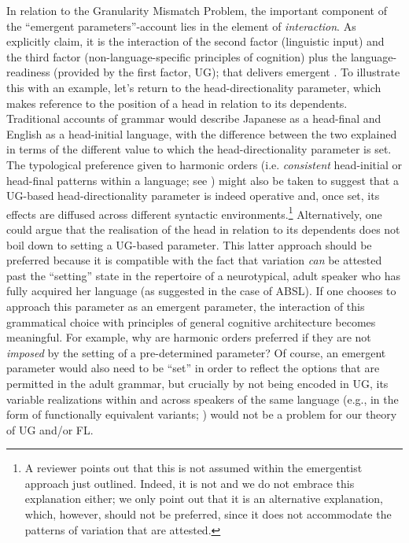 \documentclass[output=paper]{langsci/langscibook}
\begin{document}
\largerpage
In relation to the Granularity Mismatch Problem, the important component of the
\enquote{emergent parameters}-account lies in the element of
\emph{interaction}. As \citet{BibRobShee2014} explicitly claim, it is the
interaction of the second factor (linguistic input) and the third factor
(non-language-specific principles of cognition) plus the language-readiness
(provided by the first factor, \gls{UG}); that delivers emergent . To
illustrate this with an example, let’s return to the head-directionality
parameter, which makes reference to the position of a head in relation to its
dependents. Traditional accounts of grammar would describe Japanese as a
head-final and English as a head-initial language, with the difference between
the two explained in terms of the different value to which the
head-directionality parameter is set. The typological preference given to
harmonic orders (i.e. \emph{consistent} head-initial or head-final patterns
within a language; see \citealt{Hawkins2010}) might also be taken to suggest
that a UG-based head-directionality parameter is indeed operative and, once
set, its effects are diffused across different syntactic
environments.\footnote{A reviewer points out that this is not assumed within
    the emergentist approach just outlined. Indeed, it is not and we do not
    embrace this explanation either; we only point out that it is an
    alternative explanation, which, however, should not be preferred, since it
    does not accommodate the patterns of variation that are attested.}
    Alternatively, one could argue that the realisation of the head in relation
    to its dependents does not boil down to setting a \gls{UG}-based parameter.
    This latter approach should be preferred because it is compatible with the
    fact that variation \emph{can} be attested past the \enquote{setting} state in the
    repertoire of a neurotypical, adult speaker who has fully acquired her
    language (as suggested in the case of ABSL).  If one chooses to approach
    this parameter as an emergent parameter, the interaction of this
    grammatical choice with principles of general cognitive architecture
    becomes meaningful. For example, why are harmonic orders preferred if they
    are not \emph{imposed} by the setting of a pre-determined parameter? Of
    course, an emergent parameter would also need to be \enquote{set} in order
    to reflect the options that are permitted in the adult grammar, but
    crucially by not being encoded in \gls{UG}, its variable realizations
    within and across speakers of the same language (e.g., in the form of
    functionally equivalent variants; \citealt{LeivadaEtAl2017b}) would not be
    a problem for our theory of \gls{UG} and/or \gls{FL}.
\end{document}
